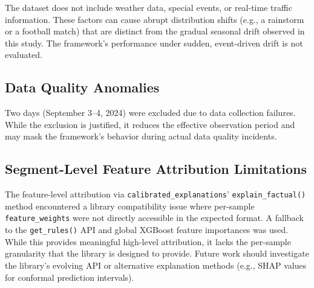 The dataset does not include weather data, special events, or real-time traffic information. These factors can cause abrupt distribution shifts (e.g., a rainstorm or a football match) that are distinct from the gradual seasonal drift observed in this study. The framework's performance under sudden, event-driven drift is not evaluated.

\subsection{Data Quality Anomalies}

Two days (September 3--4, 2024) were excluded due to data collection failures. While the exclusion is justified, it reduces the effective observation period and may mask the framework's behavior during actual data quality incidents.

\subsection{Segment-Level Feature Attribution Limitations}

The feature-level attribution via \texttt{calibrated\_explanations}' \texttt{explain\_factual()} method encountered a library compatibility issue where per-sample \texttt{feature\_weights} were not directly accessible in the expected format. A fallback to the \texttt{get\_rules()} API and global XGBoost feature importances was used. While this provides meaningful high-level attribution, it lacks the per-sample granularity that the library is designed to provide. Future work should investigate the library's evolving API or alternative explanation methods (e.g., SHAP values for conformal prediction intervals).